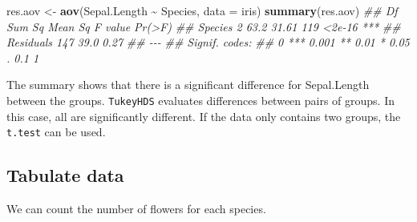 \documentclass[
  notitlepage]{book}
\newenvironment{Shaded}{\begin{snugshade}}{\end{snugshade}}
\newcommand{\CommentTok}[1]{\textcolor[rgb]{0.56,0.35,0.01}{\textit{#1}}}
\newcommand{\DataTypeTok}[1]{\textcolor[rgb]{0.13,0.29,0.53}{#1}}
\newcommand{\KeywordTok}[1]{\textcolor[rgb]{0.13,0.29,0.53}{\textbf{#1}}}
\newcommand{\NormalTok}[1]{#1}
\newcommand{\OperatorTok}[1]{\textcolor[rgb]{0.81,0.36,0.00}{\textbf{#1}}}
\newcommand{\StringTok}[1]{\textcolor[rgb]{0.31,0.60,0.02}{#1}}
\begin{document}
\begin{Shaded}
\begin{Highlighting}[]
\NormalTok{res.aov \textless{}{-}}\StringTok{ }\KeywordTok{aov}\NormalTok{(Sepal.Length }\OperatorTok{\textasciitilde{}}\StringTok{ }\NormalTok{Species, }\DataTypeTok{data =}\NormalTok{ iris)}
\KeywordTok{summary}\NormalTok{(res.aov)}
\CommentTok{\#\#              Df Sum Sq Mean Sq F value Pr(\textgreater{}F)    }
\CommentTok{\#\# Species       2   63.2   31.61     119 \textless{}2e{-}16 ***}
\CommentTok{\#\# Residuals   147   39.0    0.27                   }
\CommentTok{\#\# {-}{-}{-}}
\CommentTok{\#\# Signif. codes:  }
\CommentTok{\#\# 0 \textquotesingle{}***\textquotesingle{} 0.001 \textquotesingle{}**\textquotesingle{} 0.01 \textquotesingle{}*\textquotesingle{} 0.05 \textquotesingle{}.\textquotesingle{} 0.1 \textquotesingle{} \textquotesingle{} 1}
\end{Highlighting}
\end{Shaded}

\begin{Shaded}
\end{Shaded}

The summary shows that there is a significant difference for
Sepal.Length between the groups. \texttt{TukeyHDS} evaluates differences
between pairs of groups. In this case, all are significantly different.
If the data only contains two groups, the \texttt{t.test} can be used.

\hypertarget{tabulate-data}{%
\subsection{Tabulate data}\label{tabulate-data}}

We can count the number of flowers for each species.
\end{document}
